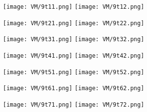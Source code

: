 

\begin{figure}[h]
		\centering
		\texttt{[image: VM/9t11.png]}
		\texttt{[image: VM/9t12.png]}
\label{ris:image}
\end{figure}



\begin{figure}[h]
		\centering
		\texttt{[image: VM/9t21.png]}
		\texttt{[image: VM/9t22.png]}
\label{ris:image}
\end{figure}



\begin{figure}[h]
		\centering
		\texttt{[image: VM/9t31.png]}
		\texttt{[image: VM/9t32.png]}
\label{ris:image}
\end{figure}



\begin{figure}[h]
		\centering
		\texttt{[image: VM/9t41.png]}
		\texttt{[image: VM/9t42.png]}
\label{ris:image}
\end{figure}



\begin{figure}[h]
		\centering
		\texttt{[image: VM/9t51.png]}
		\texttt{[image: VM/9t52.png]}
\label{ris:image}
\end{figure}



\begin{figure}[h]
		\centering
		\texttt{[image: VM/9t61.png]}
		\texttt{[image: VM/9t62.png]}
\label{ris:image}
\end{figure}



\begin{figure}[h]
		\centering
		\texttt{[image: VM/9t71.png]}
		\texttt{[image: VM/9t72.png]}
\label{ris:image}
\end{figure}



